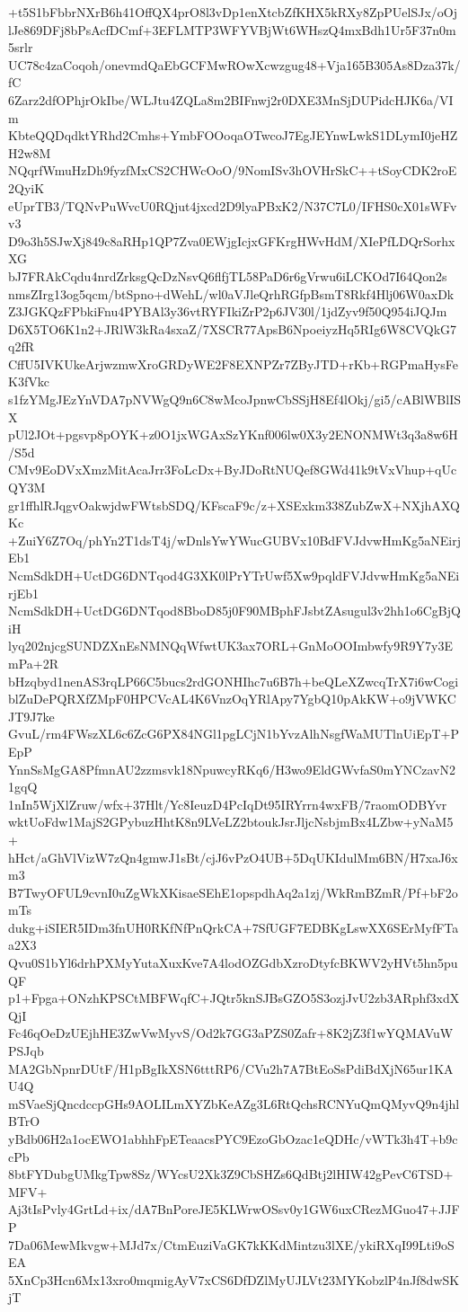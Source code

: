 +t5S1bFbbrNXrB6h41OffQX4prO8l3vDp1enXtcbZfKHX5kRXy8ZpPUelSJx/oOj
lJe869DFj8bPsAcfDCmf+3EFLMTP3WFYVBjWt6WHszQ4mxBdh1Ur5F37n0m5srlr
UC78c4zaCoqoh/onevmdQaEbGCFMwROwXcwzgug48+Vja165B305As8Dza37k/fC
6Zarz2dfOPhjrOkIbe/WLJtu4ZQLa8m2BIFnwj2r0DXE3MnSjDUPidcHJK6a/VIm
KbteQQDqdktYRhd2Cmhs+YmbFOOoqaOTwcoJ7EgJEYnwLwkS1DLymI0jeHZH2w8M
NQqrfWmuHzDh9fyzfMxCS2CHWcOoO/9NomISv3hOVHrSkC++tSoyCDK2roE2QyiK
eUprTB3/TQNvPuWvcU0RQjut4jxcd2D9lyaPBxK2/N37C7L0/IFHS0cX01sWFvv3
D9o3h5SJwXj849c8aRHp1QP7Zva0EWjgIcjxGFKrgHWvHdM/XIePfLDQrSorhxXG
bJ7FRAkCqdu4nrdZrksgQcDzNsvQ6flfjTL58PaD6r6gVrwu6iLCKOd7I64Qon2s
nmsZIrg13og5qcm/btSpno+dWehL/wl0aVJleQrhRGfpBsmT8Rkf4Hlj06W0axDk
Z3JGKQzFPbkiFnu4PYBAl3y36vtRYFIkiZrP2p6JV30l/1jdZyv9f50Q954iJQJm
D6X5TO6K1n2+JRlW3kRa4sxaZ/7XSCR77ApsB6NpoeiyzHq5RIg6W8CVQkG7q2fR
CffU5IVKUkeArjwzmwXroGRDyWE2F8EXNPZr7ZByJTD+rKb+RGPmaHysFeK3fVkc
s1fzYMgJEzYnVDA7pNVWgQ9n6C8wMcoJpnwCbSSjH8Ef4lOkj/gi5/cABlWBlISX
pUl2JOt+pgsvp8pOYK+z0O1jxWGAxSzYKnf006lw0X3y2ENONMWt3q3a8w6H/S5d
CMv9EoDVxXmzMitAcaJrr3FoLcDx+ByJDoRtNUQef8GWd41k9tVxVhup+qUcQY3M
gr1ffhlRJqgvOakwjdwFWtsbSDQ/KFscaF9c/z+XSExkm338ZubZwX+NXjhAXQKc
+ZuiY6Z7Oq/phYn2T1dsT4j/wDnlsYwYWucGUBVx10BdFVJdvwHmKg5aNEirjEb1
NcmSdkDH+UctDG6DNTqod4G3XK0lPrYTrUwf5Xw9pqldFVJdvwHmKg5aNEirjEb1
NcmSdkDH+UctDG6DNTqod8BboD85j0F90MBphFJsbtZAsugul3v2hh1o6CgBjQiH
lyq202njcgSUNDZXnEsNMNQqWfwtUK3ax7ORL+GnMoOOImbwfy9R9Y7y3EmPa+2R
bHzqbyd1nenAS3rqLP66C5bucs2rdGONHIhc7u6B7h+beQLeXZwcqTrX7i6wCogi
blZuDePQRXfZMpF0HPCVcAL4K6VnzOqYRlApy7YgbQ10pAkKW+o9jVWKCJT9J7ke
GvuL/rm4FWszXL6c6ZcG6PX84NGl1pgLCjN1bYvzAlhNsgfWaMUTlnUiEpT+PEpP
YnnSsMgGA8PfmnAU2zzmsvk18NpuwcyRKq6/H3wo9EldGWvfaS0mYNCzavN21gqQ
1nIn5WjXlZruw/wfx+37Hlt/Yc8IeuzD4PcIqDt95IRYrrn4wxFB/7raomODBYvr
wktUoFdw1MajS2GPybuzHhtK8n9LVeLZ2btoukJsrJljcNsbjmBx4LZbw+yNaM5+
hHct/aGhVlVizW7zQn4gmwJ1sBt/cjJ6vPzO4UB+5DqUKIdulMm6BN/H7xaJ6xm3
B7TwyOFUL9cvnI0uZgWkXKisaeSEhE1opspdhAq2a1zj/WkRmBZmR/Pf+bF2omTs
dukg+iSIER5IDm3fnUH0RKfNfPnQrkCA+7SfUGF7EDBKgLswXX6SErMyfFTaa2X3
Qvu0S1bYl6drhPXMyYutaXuxKve7A4lodOZGdbXzroDtyfcBKWV2yHVt5hn5puQF
p1+Fpga+ONzhKPSCtMBFWqfC+JQtr5knSJBsGZO5S3ozjJvU2zb3ARphf3xdXQjI
Fc46qOeDzUEjhHE3ZwVwMyvS/Od2k7GG3aPZS0Zafr+8K2jZ3f1wYQMAVuWPSJqb
MA2GbNpnrDUtF/H1pBgIkXSN6tttRP6/CVu2h7A7BtEoSsPdiBdXjN65ur1KAU4Q
mSVaeSjQncdccpGHs9AOLILmXYZbKeAZg3L6RtQchsRCNYuQmQMyvQ9n4jhlBTrO
yBdb06H2a1ocEWO1abhhFpETeaacsPYC9EzoGbOzac1eQDHc/vWTk3h4T+b9ccPb
8btFYDubgUMkgTpw8Sz/WYcsU2Xk3Z9CbSHZs6QdBtj2lHIW42gPevC6TSD+MFV+
Aj3tIsPvly4GrtLd+ix/dA7BnPoreJE5KLWrwOSsv0y1GW6uxCRezMGuo47+JJFP
7Da06MewMkvgw+MJd7x/CtmEuziVaGK7kKKdMintzu3lXE/ykiRXqI99Lti9oSEA
5XnCp3Hcn6Mx13xro0mqmigAyV7xCS6DfDZlMyUJLVt23MYKobzlP4nJf8dwSKjT
